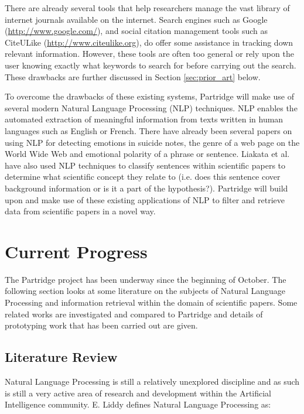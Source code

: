 \documentclass[12pt,a4paper]{article}
\begin{document}
There are already several tools that help researchers manage the vast library
of internet journals available on the internet. Search engines such as Google
({\url{http://www.google.com/}}), and social citation management tools such as
CiteULike ({\url{http://www.citeulike.org}}), do offer some assistance in
tracking down relevant information. However, these tools are often too general
or rely upon the user knowing exactly what keywords to search for before
carrying out the search. These drawbacks are further discussed in Section
\ref{sec:prior_art} below.

To overcome the drawbacks of these existing systems, Partridge will make use of
several modern Natural Language Processing (NLP) techniques.  NLP enables the
automated extraction of meaningful information from texts written in human
languages such as English or French. There have already been several papers on
using NLP for detecting emotions in suicide notes\cite{citeulike:11077287}, the
genre of a web page on the World Wide Web\cite{citeulike:11288938} and
emotional polarity of a phrase or sentence\cite{Wilson05Polarity}. Liakata et
al. have also used NLP techniques to classify sentences within scientific
papers to determine what scientific concept they relate to (i.e. does this
sentence cover background information or is it a part of the
hypothesis?)\cite{citeulike:10444769}. Partridge will build upon and make use
of these existing applications of NLP to filter and retrieve data from
scientific papers in a novel way.

\section{Current Progress}

The Partridge project has been underway since the beginning of October. The
following section looks at some literature on the subjects of Natural Language
Processing and information retrieval within the domain of scientific papers.
Some related works are investigated and compared to Partridge and details of
prototyping work that has been carried out are given.

\subsection{Literature Review}
Natural Language Processing is still a relatively unexplored discipline and as
such is still a very active area of research and development within the
Artificial Intelligence community. E. Liddy defines Natural Language Processing as:
\end{document}
